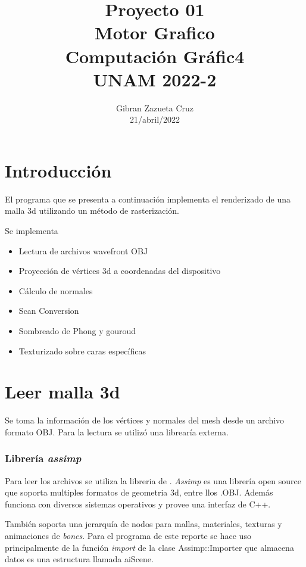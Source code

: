 \documentclass[12pt]{article}
\title{%
  Proyecto 01\\
  \large Motor Grafico \\
    \Large Computación Gráfic4\\
     \large UNAM 2022-2}
\author{Gibran Zazueta Cruz \\
\small 21/abril/2022}
\date{}
\begin{document}
\maketitle

\section{Introducción}

El programa que se presenta a continuación implementa el renderizado de una malla 3d utilizando un método de rasterización. 

Se implementa
\begin{itemize}
\item Lectura de archivos wavefront OBJ

\item Proyección de vértices 3d a coordenadas del dispositivo

\item Cálculo de normales

\item Scan Conversion

\item Sombreado de Phong y gouroud

\item Texturizado sobre caras específicas


\end{itemize}

\section{Leer malla 3d}

Se toma la información de los vértices y normales del mesh desde un archivo formato OBJ.
Para la lectura se utilizó una librearía externa.

\subsubsection{Librería \textit{assimp}}

Para leer los archivos se utiliza la libreria de . 
\textit{Assimp} es una librería open source que soporta multiples formatos de geometria 3d, entre llos .OBJ. Además funciona con diversos sistemas operativos y provee una interfaz de C++.

También soporta una jerarquía de nodos para mallas, materiales, texturas y animaciones de \textit{bones}. Para el programa de este reporte se hace uso principalmente de la función \textit{import} de la clase Assimp::Importer que almacena datos es una estructura llamada aiScene.
\end{document}
